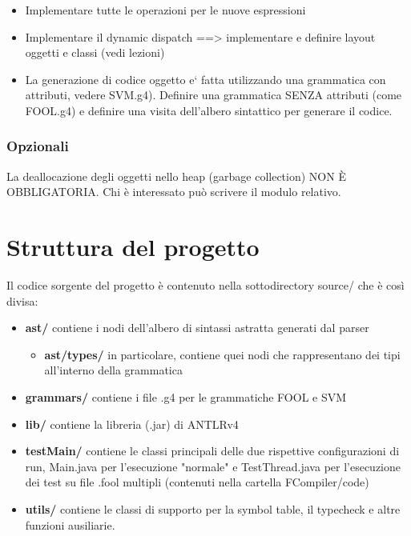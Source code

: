 \documentclass[a4paper]{article}   %
\begin{document}
\begin{itemize}
  \item Implementare tutte le operazioni per le nuove espressioni
  \item Implementare il dynamic dispatch ==> implementare e definire layout oggetti e classi
(vedi lezioni)
  \item La generazione di codice oggetto e` fatta utilizzando una grammatica con attributi,
vedere SVM.g4).
Definire una grammatica SENZA attributi (come FOOL.g4) e definire una visita
dell'albero sintattico per generare il codice.
\end{itemize}

\subsubsection{Opzionali}

La deallocazione degli oggetti nello heap (garbage collection) NON È OBBLIGATORIA.
Chi è interessato può scrivere il modulo relativo.



\section{Struttura del progetto}

Il codice sorgente del progetto è contenuto nella sottodirectory source/ che è così divisa:

\begin{itemize}
  \item \textbf{ast/} contiene i nodi dell'albero di sintassi astratta generati dal parser
  \begin{itemize}
    \item \textbf{ast/types/}
    in particolare, contiene quei nodi che rappresentano dei tipi all'interno della grammatica
  \end{itemize}
  \item \textbf{grammars/}
    contiene i file .g4 per le grammatiche FOOL e SVM
  \item \textbf{lib/}
    contiene la libreria (.jar) di ANTLRv4
  \item \textbf{testMain/}
    contiene le classi principali delle due rispettive configurazioni di run, Main.java per l'esecuzione "normale"
    e TestThread.java per l'esecuzione dei test su file .fool multipli (contenuti nella cartella FCompiler/code)
  \item \textbf{utils/}
    contiene le classi di supporto per la symbol table, il typecheck e altre funzioni ausiliarie.

\end{itemize}
\end{document}
